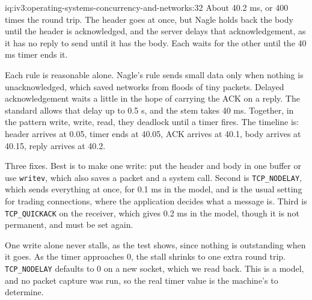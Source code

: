 \begin{solution}{iq:iv3:operating-systems-concurrency-and-networks:32}
About 40.2 ms, or 400 times the round trip. The header goes at once, but Nagle holds back the body until the header is acknowledged, and the server delays that acknowledgement, as it has no reply to send until it has the body. Each waits for the other until the 40 ms timer ends it.
\label{lst:iv3:os:nagle}

Each rule is reasonable alone. Nagle's rule sends small data only when nothing is unacknowledged, which saved networks from floods of tiny packets. Delayed acknowledgement waits a little in the hope of carrying the ACK on a reply. The standard allows that delay up to 0.5 s, and the stem takes 40 ms. Together, in the pattern write, write, read, they deadlock until a timer fires. The timeline is: header arrives at 0.05, timer ends at 40.05, ACK arrives at 40.1, body arrives at 40.15, reply arrives at 40.2.

Three fixes. Best is to make one write: put the header and body in one buffer or use \texttt{writev}, which also saves a packet and a system call. Second is \texttt{TCP\_NODELAY}, which sends everything at once, for 0.1 ms in the model, and is the usual setting for trading connections, where the application decides what a message is. Third is \texttt{TCP\_QUICKACK} on the receiver, which gives 0.2 ms in the model, though it is not permanent, and must be set again.

One write alone never stalls, as the test shows, since nothing is outstanding when it goes. As the timer approaches 0, the stall shrinks to one extra round trip. \texttt{TCP\_NODELAY} defaults to 0 on a new socket, which we read back. This is a model, and no packet capture was run, so the real timer value is the machine's to determine.

\end{solution}

